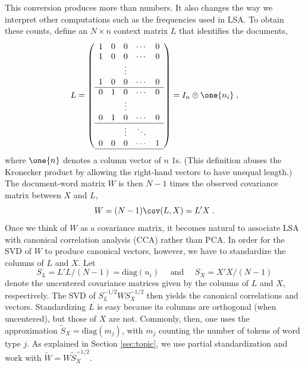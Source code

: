 \documentclass[12pt]{article}
\begin{document}
This conversion produces more than numbers.  It also changes the way we interpret other computations such as the frequencies used in LSA.  To obtain these counts, define an $N \times n$ context matrix $L$  that identifies the documents,
\begin{equation}
  L =  \left(  
           \begin{array}{ccccc}
            1  & 0 & 0 & \cdots & 0 \cr
            1  & 0 & 0 & \cdots & 0 \cr
             &&  \vdots &&                       \cr
            1 & 0 &  0 & \cdots & 0 \cr \hline
            0 & 1 & 0  & \cdots & 0 \cr
              &&  \vdots &&                        \cr
            0 & 1& 0 & \cdots & 0 \cr \hline
              &&  \vdots  &\ddots&             \cr
            0 & 0& 0 & \cdots & 1 \cr \hline        
           \end{array}
         \right) = I_n \otimes \one{n_i}  \;,
\end{equation}
where $\one{n}$ denotes a column vector of $n$ 1s. (This definition abuses the Kronecker product by allowing the right-hand vectors to have unequal length.)  The document-word matrix $W$ is then $N-1$ times the observed covariance matrix between $X$ and $L$,
\begin{equation*}
   W = (N-1) \cov(L,X) = L'X  \;.
\end{equation*}
Once we think of $W$ as a covariance matrix, it becomes natural to associate LSA with canonical correlation analysis (CCA) rather than PCA.  In order for the SVD of $W$ to produce canonical vectors, however, we have to standardize the columns of $L$ and $X$.  Let 
\begin{equation}
  S_L = L'L/(N-1) = \mbox{diag}(n_i) \quad \mbox{ and  } \quad S_X = X'X/(N-1)
\label{eq:SL}
\end{equation}
denote the uncentered covariance matrices given by the columns of $L$ and $X$, respectively.    The SVD of $S_L^{-1/2} W S_X^{-1/2}$ then yields the canonical correlations and vectors.   Standardizing $L$ is easy because its columns are orthogonal (when uncentered), but those of $X$ are not.  Commonly, then, one uses the approximation $\widetilde{S}_X = \mbox{diag}(m_j)$, with $m_j$ counting the number of tokens of word type $j$.  As explained in Section \ref{sec:topic}, we use partial standardization and work with $\widetilde{W} =W \widetilde{S}_X^{-1/2}$.
\end{document}
